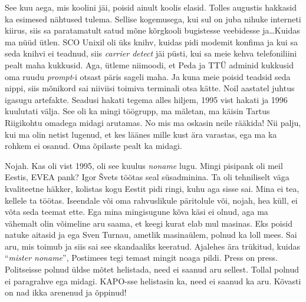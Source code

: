 See kuu aega, mis koolini jäi, poisid ainult koolis elasid. Tolles augustis 
hakkasid ka esimesed nähtused tulema. Sellise kogemusega, kui sul on juba 
nihuke interneti kiirus,  siis sa paratamatult satud mõne kõrgkooli bugistesse 
veebidesse ja\ldots Kuidas ma nüüd ütlen. SCO Unixil oli üks 
knihv, kuidas  pidi modemit konfima ja kui sa seda knihvi ei teadnud, siis 
\emph{carrier detect} jäi püsti, kui sa meie kehva telefoniliini pealt maha 
kukkusid. Aga, ütleme niimoodi, et  Peda ja TTÜ adminid kukkusid oma ruudu 
\emph{prompt}-i otsast päris sageli maha. Ja kuna meie poisid teadsid seda 
nippi, siis mõnikord sai niiviisi toimiva terminali otsa kätte. Noil aastatel 
juhtus igasugu artefakte. Seadusi hakati tegema alles hiljem, 1995 vist hakati 
ja 1996 kuulutati välja. See oli ka mingi töögrupp, ma mäletan, ma käisin 
Tartus Riigikohtu omadega midagi arutamas. No mis ma oskasin 
neile rääkida! Nii palju, kui ma olin netist lugenud, et kes läänes mille kust 
ära varastas, ega ma ka rohkem ei osanud. Oma õpilaste pealt ka midagi. 


Nojah. Kas oli vist 1995, oli see kuulus \emph{noname} 
lugu. Mingi pisipank oli meil Eestis, EVEA pank? Igor 
Švets töötas seal süsadminina. Ta oli tehniliselt väga 
kvaliteetne häkker, kolistas kogu Eestit pidi ringi, kuhu aga sisse sai. Mina 
ei tea, kellele ta töötas. Iseendale või oma rahvuslikule päritolule või, 
nojah, hea küll, ei võta seda teemat ette. Ega mina mingisugune kõva käsi ei 
olnud, aga ma vähemalt olin võimeline aru saama, et keegi kurat elab mul 
masinas. Eks poisid natuke aitasid ja ega Sven Turnau, 
ametlik masinaülem, polnud ka loll mees. Sai aru, mis toimub ja siis sai see 
skandaaliks keeratud. Ajalehes ära trükitud, kuidas \enquote{\emph{mister 
noname}},  Postimees tegi temast mingit noaga pildi. Press on press. 
Politseisse polnud üldse mõtet helistada, need ei saanud aru sellest. Tollal 
polnud ei paragrahve ega midagi. KAPO-sse helistasin ka, need ei saanud ka aru. 
Kõvasti on nad ikka arenenud ja õppinud! 

